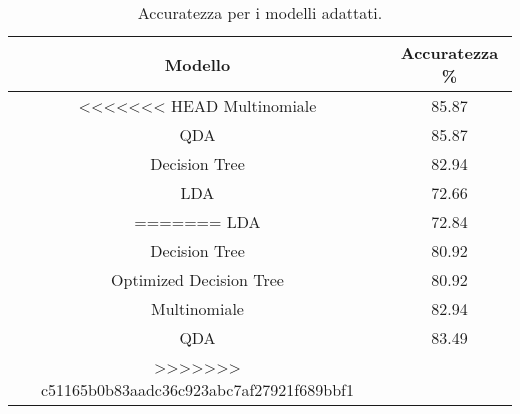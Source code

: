 \begin{table}[H]
\centering
\caption{Accuratezza per i modelli adattati.}
\begin{tabular}{cc}
\toprule
       Modello &  Accuratezza \% \\
\midrule
<<<<<<< HEAD
  Multinomiale &          85.87 \\
           QDA &          85.87 \\
 Decision Tree &          82.94 \\
           LDA &          72.66 \\
=======
                     LDA &          72.84 \\
           Decision Tree &          80.92 \\
 Optimized Decision Tree &          80.92 \\
            Multinomiale &          82.94 \\
                     QDA &          83.49 \\
>>>>>>> c51165b0b83aadc36c923abc7af27921f689bbf1
\bottomrule
\end{tabular}
\label{tab:acc}
\end{table}